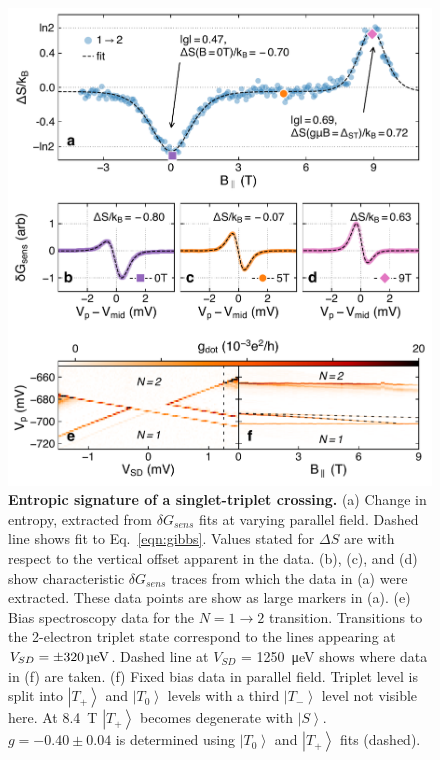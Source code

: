\documentclass[twocolumn,showpacs,amsmath,amssymb,prl,aps,superscriptaddress]{revtex4-1}
\newcommand{\ket}[1]{\ensuremath{\left|#1\right\rangle}}
\begin{document}
\begin{figure}
        \includegraphics[width=1.0\columnwidth]{../figures/figure_4.pdf}
        \caption{\label{fig:fig4}  \textbf{Entropic signature of a singlet-triplet crossing.} (a) Change in entropy, extracted from $\delta G_{sens}$ fits at varying parallel field. Dashed line shows fit to Eq.~\ref{eqn:gibbs}. Values stated for $\Delta S$ are with respect to the vertical offset apparent in the data. (b), (c), and (d) show characteristic $\delta G_{sens}$ traces from which the data in (a) were extracted. These data points are show as large markers in (a). (e) Bias spectroscopy data for the $N=1 \rightarrow 2$ transition. Transitions to the 2-electron triplet state correspond to the lines appearing at $V_{SD} = \SI{\pm 320}{\micro\electronvolt}$. Dashed line at $V_{SD}$ = \SI{1250}{\micro\electronvolt} shows where data in (f) are taken. (f) Fixed bias data in parallel field. Triplet level is split into $\ket{T_+}$ and $\ket{T_0}$ levels with a third $\ket{T_-}$ level not visible here. At \SI{8.4}{\tesla} $\ket{T_+}$ becomes degenerate with $\ket{S}$. $g=-0.40\pm0.04$ is determined using $\ket{T_0}$ and $\ket{T_+}$ fits (dashed).}
\end{figure}
\end{document}
